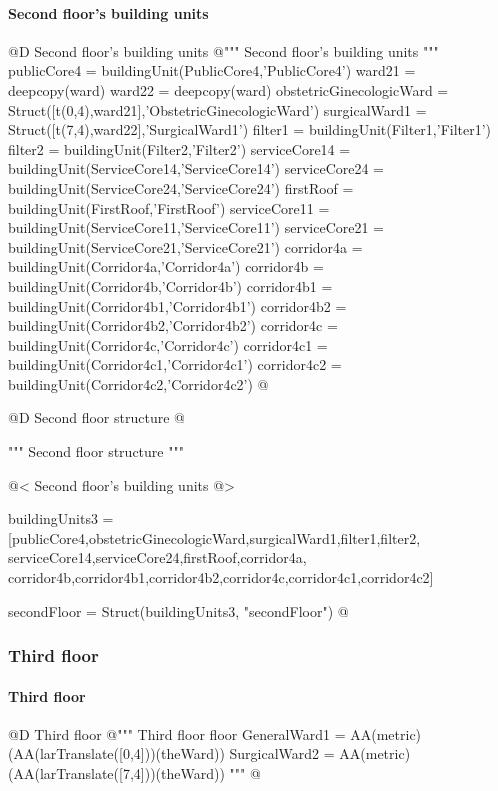 \documentclass[11pt,oneside]{article}    %
\begin{document}
\paragraph{Second floor's building units}
@D Second floor's building units 
@{""" Second floor's building units """
publicCore4 = buildingUnit(PublicCore4,'PublicCore4')
ward21 = deepcopy(ward)
ward22 = deepcopy(ward)
obstetricGinecologicWard = Struct([t(0,4),ward21],'ObstetricGinecologicWard')
surgicalWard1 = Struct([t(7,4),ward22],'SurgicalWard1')
filter1 = buildingUnit(Filter1,'Filter1')
filter2 = buildingUnit(Filter2,'Filter2')
serviceCore14 = buildingUnit(ServiceCore14,'ServiceCore14')
serviceCore24 = buildingUnit(ServiceCore24,'ServiceCore24')
firstRoof = buildingUnit(FirstRoof,'FirstRoof')
serviceCore11 = buildingUnit(ServiceCore11,'ServiceCore11')
serviceCore21 = buildingUnit(ServiceCore21,'ServiceCore21')
corridor4a = buildingUnit(Corridor4a,'Corridor4a')
corridor4b = buildingUnit(Corridor4b,'Corridor4b')
corridor4b1 = buildingUnit(Corridor4b1,'Corridor4b1')
corridor4b2 = buildingUnit(Corridor4b2,'Corridor4b2')
corridor4c = buildingUnit(Corridor4c,'Corridor4c')
corridor4c1 = buildingUnit(Corridor4c1,'Corridor4c1')
corridor4c2 = buildingUnit(Corridor4c2,'Corridor4c2')
@}

@D Second floor structure
@{""" Second floor structure """

@< Second floor's building units @>

buildingUnits3 = [publicCore4,obstetricGinecologicWard,surgicalWard1,filter1,filter2,
serviceCore14,serviceCore24,firstRoof,corridor4a,
corridor4b,corridor4b1,corridor4b2,corridor4c,corridor4c1,corridor4c2]
    
secondFloor = Struct(buildingUnits3, "secondFloor")
@}



\subsubsection{Third floor}
\paragraph{Third floor}
@D Third floor
@{""" Third floor floor 
GeneralWard1 = AA(metric)(AA(larTranslate([0,4]))(theWard))
SurgicalWard2 = AA(metric)(AA(larTranslate([7,4]))(theWard)) """
@}
\end{document}
